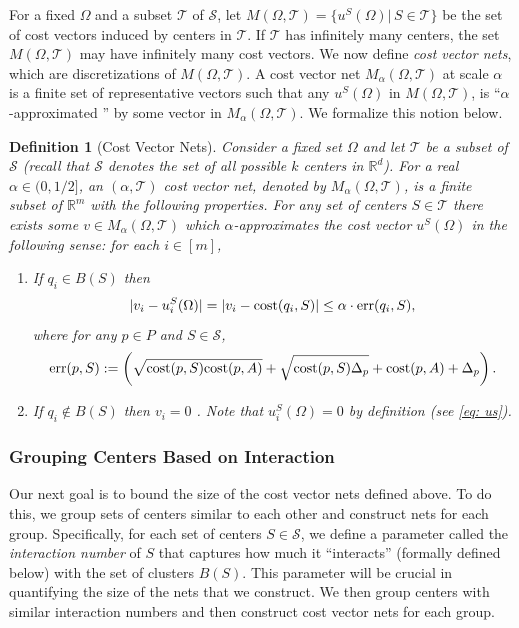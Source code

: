 \documentclass[11pt]{article}
\newtheorem{definition}[lemma]{Definition}
\theoremstyle{restate}
\theoremstyle{definition}
\newcommand{\R}{\ensuremath{\mathbb{R}}}
\newcommand{\cost}{\textnormal{cost}}
\newcommand{\err}{\textnormal{err}}
\begin{document}
For a fixed $\Omega$ and a subset $\mathcal{T}$ of $\mathcal{S}$,  let  $M(\Omega, \mathcal{T}) = \{u^S(\Omega) | \, S \in \mathcal{T}\}$ be the set of cost vectors induced by centers in $\mathcal{T}$. If $\mathcal{T}$  has infinitely many centers, the set $M(\Omega, \mathcal{T})$ may have infinitely many cost vectors. We now define \textit{cost vector nets}, which are discretizations of $M(\Omega, \mathcal{T})$.  A cost vector net $M_\alpha(\Omega, \mathcal{T})$ at scale $\alpha$ is a finite set of representative vectors such that any $u^S(\Omega)$ in $M(\Omega, \mathcal{T})$, is  ``$\alpha$-approximated '' by some vector in $M_\alpha(\Omega, \mathcal{T})$. We formalize this notion below.

\begin{definition}[Cost Vector Nets] \label{def: clustering-nets} Consider a fixed set $\Omega$ and let $\mathcal{T}$ be a subset of $\mathcal{S}$ (recall that $\mathcal{S}$ denotes the set of all possible $k$ centers in $\R^d$). For a real $\alpha \in (0,1/2]$, an $(\alpha, \mathcal{T})$ cost vector net, denoted by  $M_\alpha(\Omega, \mathcal{T})$, is a finite subset of $\R^m$ with the following properties. For any set of centers $S \in \mathcal{T}$ there exists some $v \in M_\alpha(\Omega, \mathcal{T})$ which $\alpha$-approximates the cost vector $u^S(\Omega)$ in the following sense: for each $i \in [m]$,
\begin{enumerate}
    \item If $q_i \in  B(S)$ then \[|v_i - u^S_i(\Omega)| = |v_i - \cost(q_i, S)|   \leq \alpha \cdot \err(q_i,S),\] where  for any $p \in P$ and $S \in \mathcal{S}$,
        \[\err(p,S) := \left( \sqrt{\cost(p,S)\cost(p,A)} + \sqrt{\cost(p,S) \Delta_{p} } + \cost(p,A) + \Delta_{p}\right).\]
    \item If $q_i \notin B(S)$ then $v_i = 0$ . Note that $u^S_i(\Omega) = 0$ by definition (see \eqref{eq: us}).
\end{enumerate}
\end{definition}



\subsubsection{Grouping Centers Based on Interaction}\label{sec: itneraction-of-centers}
Our next goal is to bound the size of the cost vector nets defined above. To do this, we group sets of centers similar to each other and construct nets for each group. Specifically, for each set of centers $S \in \mathcal{S}$, we define a parameter called the \emph{interaction number} of $S$ that captures how much it ``interacts'' (formally defined below) with the set of clusters $B(S)$. This parameter will be crucial in quantifying the size of the nets that we construct. We then group centers with similar interaction numbers and then construct cost vector nets for each group. 
\end{document}
